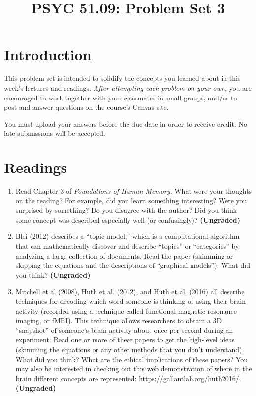 \documentclass[11pt]{article}
\title{PSYC 51.09: Problem Set 3}
\date{}
\begin{document}
\maketitle
\vspace{-0.75in}
\section*{Introduction}
This problem set is intended to solidify the concepts you learned
about in this week’s lectures and readings.  \textit{After attempting
  each problem on your own,} you are encouraged to work together with
your classmates in small groups, and/or to post and answer questions
on the course’s Canvas site.

You must upload your answers before the due date in order to receive
credit.  No late submissions will be accepted.

\section*{Readings}
\begin{enumerate}
\item Read Chapter 3 of \textit{Foundations of Human Memory}.  What were your thoughts on the reading?  For example, did you learn something interesting?  Were you surprised by something?  Do you disagree with the author?  Did you think some concept was described especially well (or confusingly)?  \textbf{(Ungraded)}
\item Blei (2012) describes a ``topic model,'' which is a computational algorithm that can mathematically discover and describe “topics” or “categories” by analyzing a large collection of documents.  Read the paper (skimming or skipping the equations and the descriptions of “graphical models”).  What did you think?  \textbf{(Ungraded)}
\item Mitchell et al (2008), Huth et al. (2012), and Huth et
  al. (2016) all describe techniques for decoding which word someone
  is thinking of using their brain activity (recorded using a
  technique called functional magnetic resonance imaging, or fMRI).
  This technique allows researchers to obtain a 3D “snapshot” of
  someone’s brain activity about once per second during an experiment.
  Read one or more of these papers to get the high-level ideas (skimming the equations or any
  other methods that you don't understand).  What did you think?  What
  are the ethical implications of these papers?  You may also be
  interested in checking out this web demonstration of where in the
  brain different concepts are represented:
  https://gallantlab.org/huth2016/.  \textbf{(Ungraded)}
\end{enumerate}
\end{document}
